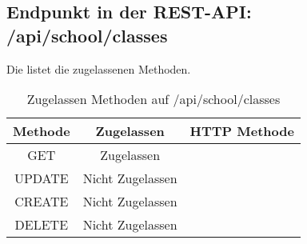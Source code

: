 \subsection{Endpunkt in der REST-API: /api/school/classes}
Die  listet die zugelassenen Methoden. 

\begin{table}[!htbp]
	\begin{tabular}{|c|c|c|}
		\hline
			\textbf{Methode} & \textbf{Zugelassen} & \textbf{HTTP Methode} \\ \hline
			GET & Zugelassen &  \\ \hline
			UPDATE & Nicht Zugelassen & \\ \hline 
			CREATE & Nicht Zugelassen & \\ \hline 
			DELETE & Nicht Zugelassen & \\ \hline
	\end{tabular}

		\caption{Zugelassen Methoden auf /api/school/classes}
		\label{tab:end:rest:api:school:classes:meth}
\end{table}